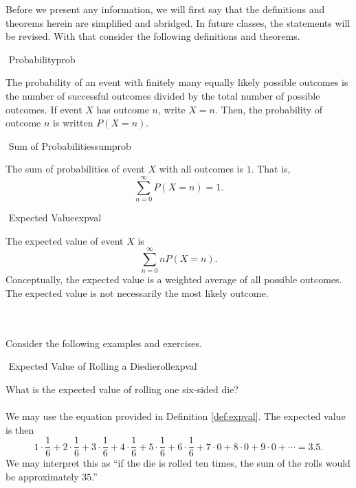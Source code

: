         Before we present any information, we will first say that the definitions and theorems herein are simplified and abridged. In future classes, the statements will be revised. With that consider the following definitions and theorems.
        \begin{definition}{\Stop\,\,Probability}{prob}
        
            The probability of an event with finitely many equally likely possible outcomes is the number of successful outcomes divided by the total number of possible outcomes. If event \(X\) has outcome \(n\), write \(X=n\). Then, the probability of outcome \(n\) is written \(P(X=n)\).
        
        \end{definition}
        \begin{theorem}{\Stop\,\,Sum of Probabilities}{sumprob}
        
            The sum of probabilities of event \(X\) with all outcomes is \(1\). That is,
           \begin{equation*}
               \sum_{n=0}^\infty P(X=n)=1.
           \end{equation*}
        
        \end{theorem}
        \begin{definition}{\Stop\,\,Expected Value}{expval}
        
            The expected value of event \(X\) is
            \begin{equation*}
                \sum_{n=0}^\infty nP(X=n).
            \end{equation*}
            Conceptually, the expected value is a weighted average of all possible outcomes. The expected value is not necessarily the most likely outcome.
        
        \end{definition}
        \vphantom
        \\
        \\
        Consider the following examples and exercises.
        \begin{example}{\Difficulty\,\,Expected Value of Rolling a Die}{dierollexpval}
        
            What is the expected value of rolling one six-sided die?
            \\
            \\
            We may use the equation provided in Definition \ref{def:expval}. The expected value is then
            \begin{equation*}
                1\cdot\frac{1}{6}+2\cdot\frac{1}{6}+3\cdot\frac{1}{6}+4\cdot\frac{1}{6}+5\cdot\frac{1}{6}+6\cdot\frac{1}{6}+7\cdot0+8\cdot0+9\cdot0+\cdots=3.5.
            \end{equation*}
            We may interpret this as ``if the die is rolled ten times, the sum of the rolls would be approximately \(35\).''
        
        \end{example}
